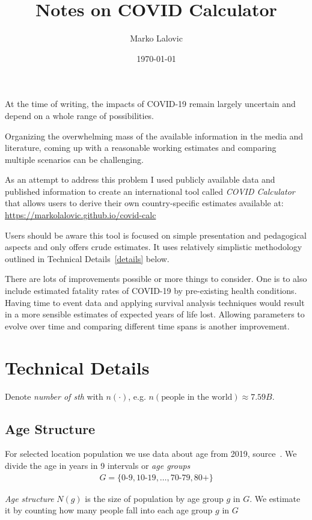 \documentclass[12pt]{article}
\title{Notes on COVID Calculator}
\author{Marko Lalovic}
\date{\today}
\begin{document}
\maketitle

 At the time of writing, the impacts of COVID-19 remain largely uncertain and depend on a whole range of possibilities.

Organizing the overwhelming mass of the available information in the media and literature,
coming up with a reasonable working estimates and comparing multiple scenarios can be challenging.

As an attempt to address this problem I used publicly available data and published information
to create an international tool called {\it COVID Calculator} that allows users to derive their own country-specific estimates available at: \url{https://markolalovic.github.io/covid-calc}

Users should be aware this tool is focused on simple presentation and pedagogical aspects and only offers crude estimates. It uses relatively simplistic methodology outlined in Technical Details~\ref{details} below.

There are lots of improvements possible or more things to consider. One is to also include estimated fatality rates of COVID-19 by pre-existing health conditions. Having time to event data and applying survival analysis techniques would result in a more sensible estimates of expected years of life lost. Allowing parameters to evolve over time and comparing different time spans is another improvement.

\section*{Technical Details}\label{details}
Denote {\it number of sth} with $n(\cdot)$, e.g. $n(\text{people in the world}) \approx 7.59B$.

\subsection*{Age Structure}
For selected location population we use data about age from 2019, source~\cite{pyramids}. We divide the age in years in 9 intervals or {\it age groups}
\begin{align*}
G =
  \{ \text{0-9}, \text{10-19}, \ldots, \text{70-79}, \text{80+} \}
\end{align*}

{\it Age structure} $N(g)$ is the size of population by age group $g$ in $G$. We estimate it by counting how many people fall into each age group $g$ in $G$
\end{document}
